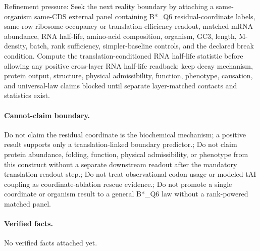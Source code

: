 Refinement pressure: Seek the next reality boundary by attaching a same-organism same-CDS external panel containing B*\_Q6 residual-coordinate labels, same-row ribosome-occupancy or translation-efficiency readout, matched mRNA abundance, RNA half-life, amino-acid composition, organism, GC3, length, M-density, batch, rank sufficiency, simpler-baseline controls, and the declared break condition. Compute the translation-conditioned RNA half-life statistic before allowing any positive cross-layer RNA half-life readback; keep decay mechanism, protein output, structure, physical admissibility, function, phenotype, causation, and universal-law claims blocked until separate layer-matched contacts and statistics exist.

\paragraph{Cannot-claim boundary.} Do not claim the residual coordinate is the biochemical mechanism; a positive result supports only a translation-linked boundary predictor.; Do not claim protein abundance, folding, function, physical admissibility, or phenotype from this construct without a separate downstream readout after the mandatory translation-readout step.; Do not treat observational codon-usage or modeled-tAI coupling as coordinate-ablation rescue evidence.; Do not promote a single coordinate or organism result to a general B*\_Q6 law without a rank-powered matched panel.

\paragraph{Verified facts.}
No verified facts attached yet.

